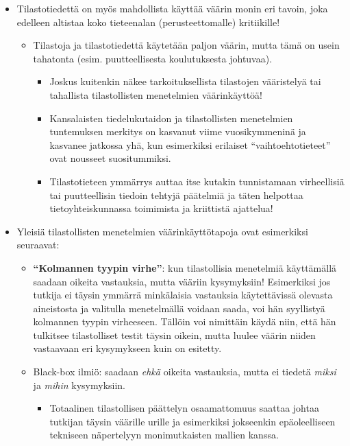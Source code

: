 \documentclass[
]{book}
\providecommand{\tightlist}{%
  \setlength{\itemsep}{0pt}\setlength{\parskip}{0pt}}
\begin{document}
\begin{itemize}
\tightlist
\item
  Tilastotiedettä on myös mahdollista käyttää väärin monin eri tavoin, joka edelleen altistaa koko tieteenalan (perusteettomalle) kritiikille!

  \begin{itemize}
  \tightlist
  \item
    Tilastoja ja tilastotiedettä käytetään paljon väärin, mutta tämä on usein tahatonta (esim. puutteellisesta koulutuksesta johtuvaa).

    \begin{itemize}
    \tightlist
    \item
      Joskus kuitenkin näkee tarkoituksellista tilastojen vääristelyä tai tahallista tilastollisten menetelmien väärinkäyttöä!
    \item
      Kansalaisten tiedelukutaidon ja tilastollisten menetelmien tuntemuksen merkitys on kasvanut viime vuosikymmeninä ja kasvanee jatkossa yhä, kun esimerkiksi erilaiset ``vaihtoehtotieteet'' ovat nousseet suositummiksi.
    \item
      Tilastotieteen ymmärrys auttaa itse kutakin tunnistamaan virheellisiä tai puutteellisin tiedoin tehtyjä päätelmiä ja täten helpottaa tietoyhteiskunnassa toimimista ja kriittistä ajattelua!
    \end{itemize}
  \end{itemize}
\item
  Yleisiä tilastollisten menetelmien väärinkäyttötapoja ovat esimerkiksi seuraavat:

  \begin{itemize}
  \tightlist
  \item
    \textbf{``Kolmannen tyypin virhe''}: kun tilastollisia menetelmiä käyttämällä saadaan oikeita vastauksia, mutta vääriin kysymyksiin! Esimerkiksi jos tutkija ei täysin ymmärrä minkälaisia vastauksia käytettävissä olevasta aineistosta ja valitulla menetelmällä voidaan saada, voi hän syyllistyä kolmannen tyypin virheeseen. Tällöin voi nimittäin käydä niin, että hän tulkitsee tilastolliset testit täysin oikein, mutta luulee väärin niiden vastaavaan eri kysymykseen kuin on esitetty.
  \item
    Black-box ilmiö: saadaan \emph{ehkä} oikeita vastauksia, mutta ei tiedetä \emph{miksi} ja \emph{mihin} kysymyksiin.

    \begin{itemize}
    \tightlist
    \item
      Totaalinen tilastollisen päättelyn osaamattomuus saattaa johtaa tutkijan täysin väärille urille ja esimerkiksi jokseenkin epäoleelliseen tekniseen näpertelyyn monimutkaisten mallien kanssa.
    \end{itemize}
  \end{itemize}
\end{itemize}
\end{document}
